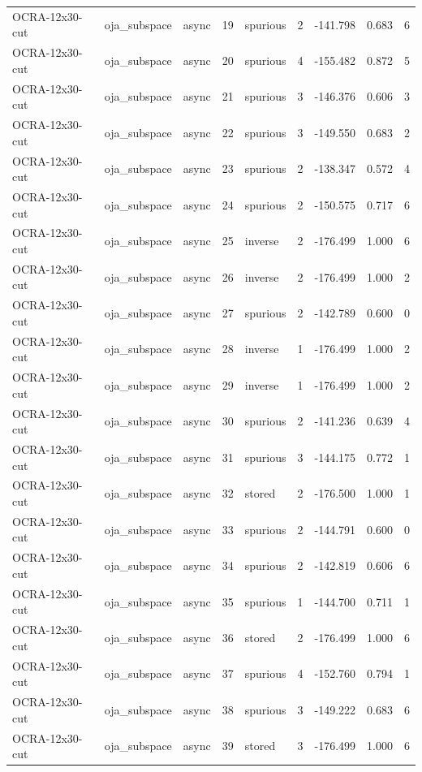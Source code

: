 \begin{tabular}{lllrlrrrr}
OCRA-12x30-cut & oja\_subspace & async & 19 & spurious & 2 & -141.798 & 0.683 & 6 \\
OCRA-12x30-cut & oja\_subspace & async & 20 & spurious & 4 & -155.482 & 0.872 & 5 \\
OCRA-12x30-cut & oja\_subspace & async & 21 & spurious & 3 & -146.376 & 0.606 & 3 \\
OCRA-12x30-cut & oja\_subspace & async & 22 & spurious & 3 & -149.550 & 0.683 & 2 \\
OCRA-12x30-cut & oja\_subspace & async & 23 & spurious & 2 & -138.347 & 0.572 & 4 \\
OCRA-12x30-cut & oja\_subspace & async & 24 & spurious & 2 & -150.575 & 0.717 & 6 \\
OCRA-12x30-cut & oja\_subspace & async & 25 & inverse & 2 & -176.499 & 1.000 & 6 \\
OCRA-12x30-cut & oja\_subspace & async & 26 & inverse & 2 & -176.499 & 1.000 & 2 \\
OCRA-12x30-cut & oja\_subspace & async & 27 & spurious & 2 & -142.789 & 0.600 & 0 \\
OCRA-12x30-cut & oja\_subspace & async & 28 & inverse & 1 & -176.499 & 1.000 & 2 \\
OCRA-12x30-cut & oja\_subspace & async & 29 & inverse & 1 & -176.499 & 1.000 & 2 \\
OCRA-12x30-cut & oja\_subspace & async & 30 & spurious & 2 & -141.236 & 0.639 & 4 \\
OCRA-12x30-cut & oja\_subspace & async & 31 & spurious & 3 & -144.175 & 0.772 & 1 \\
OCRA-12x30-cut & oja\_subspace & async & 32 & stored & 2 & -176.500 & 1.000 & 1 \\
OCRA-12x30-cut & oja\_subspace & async & 33 & spurious & 2 & -144.791 & 0.600 & 0 \\
OCRA-12x30-cut & oja\_subspace & async & 34 & spurious & 2 & -142.819 & 0.606 & 6 \\
OCRA-12x30-cut & oja\_subspace & async & 35 & spurious & 1 & -144.700 & 0.711 & 1 \\
OCRA-12x30-cut & oja\_subspace & async & 36 & stored & 2 & -176.499 & 1.000 & 6 \\
OCRA-12x30-cut & oja\_subspace & async & 37 & spurious & 4 & -152.760 & 0.794 & 1 \\
OCRA-12x30-cut & oja\_subspace & async & 38 & spurious & 3 & -149.222 & 0.683 & 6 \\
OCRA-12x30-cut & oja\_subspace & async & 39 & stored & 3 & -176.499 & 1.000 & 6 \\

\end{tabular}
